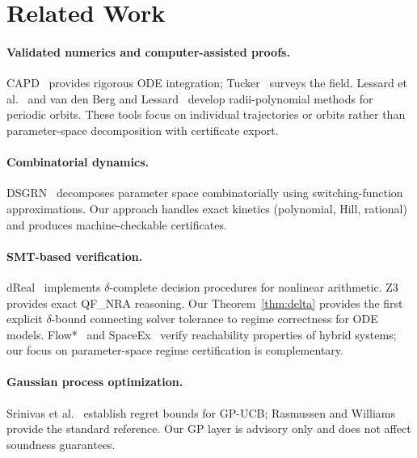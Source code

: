 \documentclass[11pt]{article}
\begin{document}
\section{Related Work}
\label{sec:related}

\paragraph{Validated numerics and computer-assisted proofs.}
CAPD~\cite{kapela2021capd} provides rigorous ODE integration; Tucker~\cite{tucker2011validated} surveys the field.
Lessard et al.~\cite{lessard2014computer} and van den Berg and Lessard~\cite{vandenberg2015rigorous} develop radii-polynomial methods for periodic orbits.
These tools focus on individual trajectories or orbits rather than parameter-space decomposition with certificate export.

\paragraph{Combinatorial dynamics.}
DSGRN~\cite{cummins2016dsgrn} decomposes parameter space combinatorially using switching-function approximations.
Our approach handles exact kinetics (polynomial, Hill, rational) and produces machine-checkable certificates.

\paragraph{SMT-based verification.}
dReal~\cite{gao2013dreal} implements $\delta$-complete decision procedures for nonlinear arithmetic.
Z3~\cite{demoura2008z3} provides exact QF\_NRA reasoning.
Our Theorem~\ref{thm:delta} provides the first explicit $\delta$-bound connecting solver tolerance to regime correctness for ODE models.
Flow*~\cite{chen2013flow} and SpaceEx~\cite{frehse2011spaceex} verify reachability properties of hybrid systems; our focus on parameter-space regime certification is complementary.

\paragraph{Gaussian process optimization.}
Srinivas et al.~\cite{srinivas2010} establish regret bounds for GP-UCB; Rasmussen and Williams~\cite{rasmussen2006} provide the standard reference.
Our GP layer is advisory only and does not affect soundness guarantees.
\end{document}
